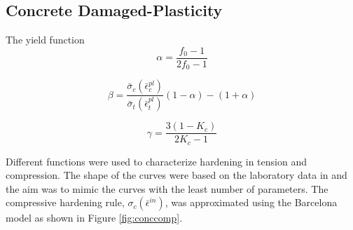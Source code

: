 \subsection{Concrete Damaged-Plasticity}

The yield function
\begin{equation}
\alpha = \frac{f_0-1}{2f_0-1}
\label{eqn:param1}
\end{equation}

\begin{equation}
\beta = \frac{\bar{\sigma}_c\left( \bar{\epsilon}^{pl}_c\right )}{\bar{\sigma}_t\left( \bar{\epsilon}^{pl}_t\right )}\left(1-\alpha \right )-\left( 1+\alpha \right)
\label{eqn:param1-2}
\end{equation}

\begin{equation}
\gamma = \frac{3\left(1-K_c \right)}{2K_c-1}
\label{eqn:param1-3}
\end{equation}


Different functions were used to characterize hardening in tension and compression. The shape of the curves were based on the laboratory data in \citet{wahalathantri_material_2011} and the aim was to mimic the curves with the least number of parameters. The compressive hardening rule, $\sigma_{c}\left(\bar{\epsilon}^{in}\right)$, was approximated using the Barcelona model as shown in Figure \ref{fig:conccomp}. 
